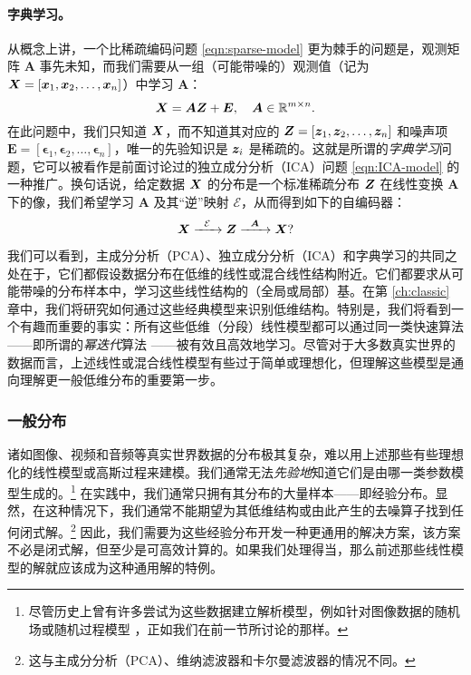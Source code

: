\documentclass[../../book-main.tex]{subfiles}
\begin{document}
\paragraph{字典学习。}
从概念上讲，一个比稀疏编码问题 \eqref{eqn:sparse-model} 更为棘手的问题是，观测矩阵 $\boldsymbol{A}$ 事先未知，而我们需要从一组（可能带噪的）观测值（记为 $\bm{X} = [\bm{x}_1, \bm{x}_2, \ldots, \bm{x}_n]$）中学习 $\boldsymbol{A}$：
\begin{equation}
    \bm{X} = \boldsymbol{A} \bm{Z} + \boldsymbol{E}, \quad \boldsymbol{A} \in \mathbb{R}^{m\times n}.
    \label{eqn:dictionary-learning}
\end{equation}
在此问题中，我们只知道 $\bm{X}$，而不知道其对应的 $\bm{Z} = [\bm{z}_1, \bm{z}_2, \ldots, \bm{z}_n]$ 和噪声项 $\boldsymbol{E}= [\boldsymbol{\epsilon}_1, \boldsymbol{\epsilon}_2, \ldots, \boldsymbol{\epsilon}_n]$，唯一的先验知识是 $\bm{z}_i$ 是稀疏的。这就是所谓的{\em 字典学习}问题，它可以被看作是前面讨论过的独立成分分析（ICA）问题 \eqref{eqn:ICA-model} 的一种推广。换句话说，给定数据 $\bm{X}$ 的分布是一个标准稀疏分布 $\bm{Z}$ 在线性变换 $\boldsymbol{A}$ 下的像，我们希望学习 $\boldsymbol{A}$ 及其“逆”映射 $\mathcal{E}$，从而得到如下的自编码器：
\begin{equation}
    \bm{X}   \xrightarrow{\hspace{2mm} \mathcal{E} \hspace{2mm}}  \bm{Z} \xrightarrow{\hspace{2mm} \boldsymbol{A} \hspace{2mm}} \bm{X}?
       \label{eqn:decoding-DL}
\end{equation}

我们可以看到，主成分分析（PCA）、独立成分分析（ICA）和字典学习的共同之处在于，它们都假设数据分布在低维的线性或混合线性结构附近。它们都要求从可能带噪的分布样本中，学习这些线性结构的（全局或局部）基。在第 \ref{ch:classic} 章中，我们将研究如何通过这些经典模型来识别低维结构。特别是，我们将看到一个有趣而重要的事实：所有这些低维（分段）线性模型都可以通过同一类快速算法——即所谓的{\em 幂迭代}算法 \cite{Zhai-2020}——被有效且高效地学习。尽管对于大多数真实世界的数据而言，上述线性或混合线性模型有些过于简单或理想化，但理解这些模型是通向理解更一般低维分布的重要第一步。

\subsubsection{一般分布}\label{sec:denoising-intro}

诸如图像、视频和音频等真实世界数据的分布极其复杂，难以用上述那些有些理想化的线性模型或高斯过程来建模。我们通常无法{\em 先验地}知道它们是由哪一类参数模型生成的。\footnote{尽管历史上曾有许多尝试为这些数据建立解析模型，例如针对图像数据的随机场或随机过程模型 \cite{Mumford-1999}，正如我们在前一节所讨论的那样。} 在实践中，我们通常只拥有其分布的大量样本——即经验分布。显然，在这种情况下，我们通常不能期望为其低维结构或由此产生的去噪算子找到任何闭式解。\footnote{这与主成分分析（PCA）、维纳滤波器和卡尔曼滤波器的情况不同。} 因此，我们需要为这些经验分布开发一种更通用的解决方案，该方案不必是闭式解，但至少是可高效计算的。如果我们处理得当，那么前述那些线性模型的解就应该成为这种通用解的特例。
\end{document}
